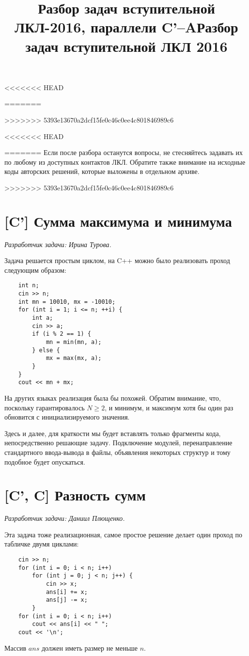 \documentclass[12pt]{article}
\theoremstyle{definition}
\begin{document}
<<<<<<< HEAD
\title{Разбор задач вступительной ЛКЛ-2016, параллели C'--A}
=======
\title{Разбор задач вступительной ЛКЛ 2016}
>>>>>>> 5393e13670a2dcf15fe0c46c0ee4c801846989c6
\date{}

\renewcommand{\thesection}{\Alph{section}.}
\maketitle
<<<<<<< HEAD

\tableofcontents
=======
Если после разбора останутся вопросы, не стесняйтесь задавать их по любому из доступных контактов ЛКЛ. Обратите также внимание на исходные коды авторских решений,
которые выложены в отдельном архиве.

\tableofcontents


>>>>>>> 5393e13670a2dcf15fe0c46c0ee4c801846989c6
\section{[C'] Сумма максимума и минимума}
\textit{Разработчик задачи: Ирина Турова.}

Задача решается простым циклом, на C++ можно было реализовать проход следующим образом:
\begin{lstlisting}
    int n;
    cin >> n;
    int mn = 10010, mx = -10010;
    for (int i = 1; i <= n; ++i) {
        int a;
        cin >> a;
        if (i % 2 == 1) {
            mn = min(mn, a);
        } else {
            mx = max(mx, a);
        }
    }
    cout << mn + mx;
\end{lstlisting}
На других языках реализация была бы похожей. Обратим внимание, что, поскольку гарантировалось $N \ge 2$, и минимум, и максимум хотя бы один раз обновится с инициализируемого значения.

Здесь и далее, для краткости мы будет вставлять только фрагменты кода, непосредственно
решающие задачу. Подключение модулей, перенаправление стандартного ввода-вывода в файлы,
объявления некоторых структур и тому подобное будет опускаться.


\pagebreak
\section{[C', C] Разность сумм}
\textit{Разработчик задачи: Даниил Плющенко.}

Эта задача тоже реализационная, самое простое решение делает один проход по табличке
двумя циклами:
\begin{lstlisting}
    cin >> n;
    for (int i = 0; i < n; i++)
        for (int j = 0; j < n; j++) {
            cin >> x;
            ans[i] += x;
            ans[j] -= x;
        }
    for (int i = 0; i < n; i++)
        cout << ans[i] << " ";
    cout << '\n';
\end{lstlisting}
Массив $ans$ должен иметь размер не меньше $n$.
\end{document}

